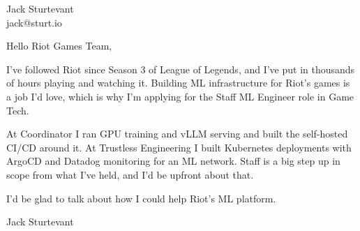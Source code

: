 \documentclass[11pt]{article}
\begin{document}
\raggedright

{\namefont\fontsize{20pt}{24pt}\selectfont Jack Sturtevant}\\[-0.3em]
jack@sturt.io

\vspace{1.2em}

Hello Riot Games Team,

I've followed Riot since Season 3 of League of Legends, and I've put in thousands of hours playing and watching it. Building ML infrastructure for Riot's games is a job I'd love, which is why I'm applying for the Staff ML Engineer role in Game Tech.

At Coordinator I ran GPU training and vLLM serving and built the self-hosted CI/CD around it. At Trustless Engineering I built Kubernetes deployments with ArgoCD and Datadog monitoring for an ML network. Staff is a big step up in scope from what I've held, and I'd be upfront about that.

I'd be glad to talk about how I could help Riot's ML platform.

\vspace{0.6em}
Jack Sturtevant
\end{document}
